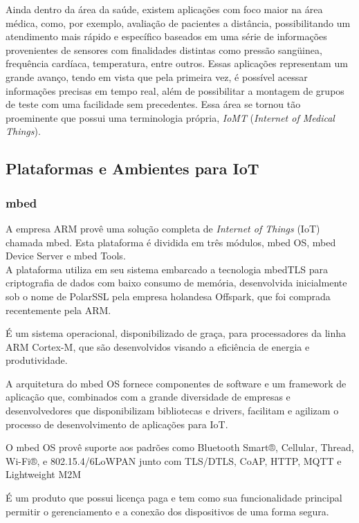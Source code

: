 Ainda dentro da área da saúde, existem aplicações com foco maior na área médica, como, por exemplo,
avaliação de pacientes a distância, possibilitando um atendimento mais rápido e específico baseados em uma
série de informações provenientes de sensores com finalidades distintas como pressão sangüinea,
frequência cardíaca, temperatura, entre outros. Essas aplicações representam um grande avanço, tendo
em vista que pela primeira vez, é possível acessar informações precisas em tempo real, além de possibilitar
a montagem de grupos de teste com uma facilidade sem precedentes. Essa área se tornou tão proeminente que
possui uma terminologia própria, \textit{IoMT} (\textit{Internet of Medical Things}).


\subsection{Plataformas e Ambientes para IoT}
\label{sec:IoTPlataformas}

\subsubsection{mbed}
A empresa ARM provê uma solução completa de \textit{Internet of Things} (IoT) chamada mbed\cite{mbed}.
Esta plataforma é dividida em três módulos, mbed OS, mbed Device Server e mbed Tools.\\
A plataforma utiliza em seu sistema embarcado a tecnologia mbedTLS para criptografia de dados com baixo
consumo de memória, desenvolvida inicialmente sob o nome de PolarSSL pela empresa holandesa Offspark,
que foi comprada recentemente pela ARM.

É um sistema operacional, disponibilizado de graça, para processadores da linha ARM Cortex-M, que são
desenvolvidos visando a eficiência de energia e produtividade.

A arquitetura do mbed OS fornece componentes de software e um framework de aplicação que, combinados
com a grande diversidade de empresas e desenvolvedores que disponibilizam bibliotecas e drivers, facilitam
e agilizam o processo de desenvolvimento de aplicações para IoT.

O mbed OS provê suporte aos padrões como Bluetooth Smart®, Cellular, Thread, Wi-Fi®, e 802.15.4/6LoWPAN junto
com TLS/DTLS, CoAP, HTTP, MQTT e Lightweight M2M

É um produto que possui licença paga e tem como sua funcionalidade principal permitir o gerenciamento
e a conexão dos dispositivos de uma forma segura.


